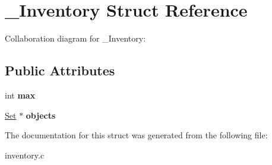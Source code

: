 \hypertarget{struct__Inventory}{}\section{\+\_\+\+Inventory Struct Reference}
\label{struct__Inventory}


Collaboration diagram for \+\_\+\+Inventory\+:
\subsection*{Public Attributes}
\begin{DoxyCompactItemize}
\item 
\mbox{\label{struct__Inventory_ac09bcf212b2c7ff348066b2e5f28bb9c}} 
int {\bfseries max}
\item 
\mbox{\label{struct__Inventory_a478e4b50a62b9e7d5b17e335319faa97}} 
\hyperlink{struct__Set}{Set} $\ast$ {\bfseries objects}
\end{DoxyCompactItemize}


The documentation for this struct was generated from the following file\+:\begin{DoxyCompactItemize}
\item 
inventory.\+c\end{DoxyCompactItemize}
